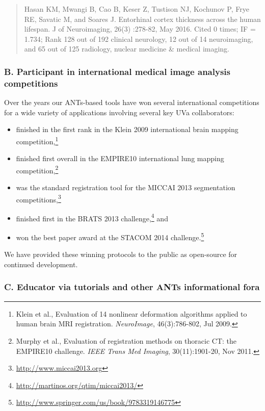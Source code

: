 \documentclass[11pt,]{article}
\let\rmarkdownfootnote\footnote%
\def\footnote{\protect\rmarkdownfootnote}
\begin{document}
\begin{quote}
Hasan KM, Mwangi B, Cao B, Keser Z, Tustison NJ, Kochunov P, Frye RE,
Savatic M, and Soares J. Entorhinal cortex thickness across the human
lifespan. J of Neuroimaging, 26(3) :278-82, May 2016. Cited 0 times; IF
= 1.734; Rank 128 out of 192 clinical neurology, 12 out of 14
neuroimaging, and 65 out of 125 radiology, nuclear medicine \& medical
imaging.
\end{quote}

\subsubsection{B. Participant in international medical image analysis
competitions}\label{b.-participant-in-international-medical-image-analysis-competitions}

Over the years our ANTs-based tools have won several international
competitions for a wide variety of applications involving several key
UVa collaborators:

\begin{itemize}
\item
  finished in the first rank in the Klein 2009 international brain
  mapping competition,\footnote{Klein et al., Evaluation of 14 nonlinear
    deformation algorithms applied to human brain MRI registration.
    \emph{NeuroImage}, 46(3):786-802, Jul 2009.}
\item
  finished first overall in the EMPIRE10 international lung mapping
  competition,\footnote{Murphy et al., Evaluation of registration
    methods on thoracic CT: the EMPIRE10 challenge. \emph{IEEE Trans Med
    Imaging}, 30(11):1901-20, Nov 2011.}
\item
  was the standard registration tool for the MICCAI 2013 segmentation
  competitions,\footnote{\url{http://www.miccai2013.org}}
\item
  finished first in the BRATS 2013 challenge,\footnote{\url{http://martinos.org/qtim/miccai2013/}}
  and
\item
  won the best paper award at the STACOM 2014 challenge.\footnote{\url{http://www.springer.com/us/book/9783319146775}}
\end{itemize}

We have provided these winning protocols to the public as open-source
for continued development.

\subsubsection{C. Educator via tutorials and other ANTs informational
fora}\label{c.-educator-via-tutorials-and-other-ants-informational-fora}
\end{document}
